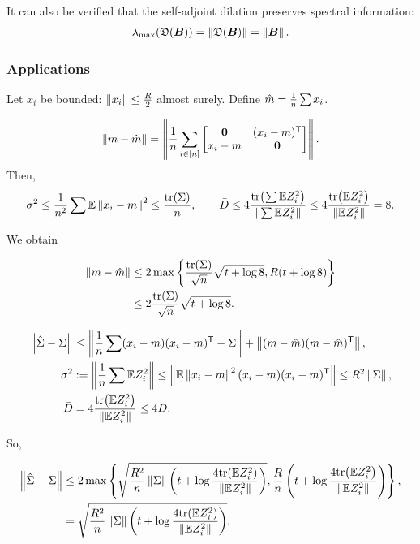 \documentclass[10pt]{article}
\begin{document}
It can also be verified that the self-adjoint dilation preserves spectral information:
\begin{align}
	\lambda_{\max} (\mathfrak{D}(\boldsymbol{B})) = \left \lVert\mathfrak{D}(\boldsymbol{B}) \right \rVert = \left \lVert\boldsymbol{B} \right \rVert.
\end{align}

\subsubsection{Applications}

 	Let $x_i$ be bounded: $\left \lVert x_i \right \rVert \leq \frac{R}{2}$ almost surely. Define $\hat{m}=\frac{1}{n} \sum x_i$.  

	\begin{align}
		\left \lVert m - \hat{m} \right \rVert = \left \lVert \frac{1}{n} \sum_{i \in [n]} 
		\begin{bmatrix}
			\boldsymbol{0} & (x_i - m)^{\mathsf{T}} \\
			x_i - m & \boldsymbol{0}
		\end{bmatrix}
		 \right \rVert.
	\end{align}
	Then,
	\begin{align}
		\sigma^2 \leq \frac{1}{n^2} \sum \mathbb{E} \left \lVert x_i - m \right \rVert^2 \leq \frac{{\operatorname{tr}\!\left(\Sigma\right)}}{n}, 
\qquad
		\bar{D} \leq 4 \frac{{\operatorname{tr}\!\left(\sum \mathbb{E} Z_i^2\right)}}{ \left \lVert \sum \mathbb{E} Z_i^2 \right \rVert} 
		\leq 4  \frac{ {\operatorname{tr}\!\left(\mathbb{E} Z_i^2\right)}}{ \left \lVert \mathbb{E} Z_i^2 \right \rVert} = 8.
	\end{align}
	
	We obtain
	
	\begin{align}
		\left \lVert m - \hat{m} \right \rVert &\leq 2 \max \left\{ \frac{{\operatorname{tr}\!\left(\Sigma\right)}}{\sqrt{n}} \sqrt{t + \log 8}, R (t + \log 8)\right \} \\
		&\leq 2 \frac{ {\operatorname{tr}\!\left(\Sigma\right)}}{\sqrt{n}} \sqrt{t + \log 8}.
	\end{align}
	
	
	\begin{align}
		\norm{\mh{\Sig}-\Sig} &\leq \norm{ \frac{1}{n} \sum (x_i - m) (x_i - m)\T - \Sig} + \norm{ (m - \mh{m}) (m - \mh{m})\T}, \\
% 
		\sig^2 &:= \norm{ \frac{1}{n} \sum \EE Z_i^2 } \leq \norm{ \EE \norm{x_i-m}^2 (x_i - m)(x_i-m)\T} \leq R^2 \norm{\Sig}, \\
		\bar{D} &= 4 \frac{\trace{\EE Z_i^2}}{ \norm{ \EE Z_i^2}} \leq 4D.
	\end{align}
	
	So,
	
	\begin{align}
		\left \lVert\hat{\Sigma}-\Sigma \right \rVert &\leq 2 \max \left \{ \sqrt{\frac{R^2}{n} \left \lVert\Sigma \right \rVert \left( t + \log \frac{ 4 {\operatorname{tr}\!\left(\mathbb{E} Z_i^2\right)}}{\left \lVert\mathbb{E} Z_i^2 \right \rVert}\right)} , \frac{R}{n} \left( t + \log  \frac{4{\operatorname{tr}\!\left(\mathbb{E} Z_i^2\right)}}{\left \lVert\mathbb{E} Z_i^2 \right \rVert} \right) \right\}, \\
		& = \sqrt{\frac{R^2}{n} \left \lVert\Sigma \right \rVert \left( t + \log \frac{ 4 {\operatorname{tr}\!\left(\mathbb{E} Z_i^2\right)}}{\left \lVert\mathbb{E} Z_i^2 \right \rVert}\right)}. 
	\end{align}
	
\end{document}
